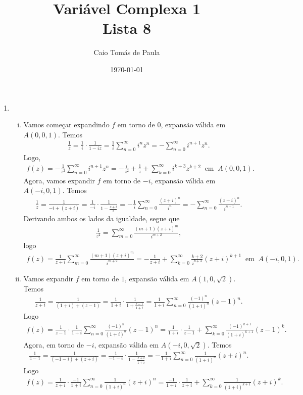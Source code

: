 \documentclass[12pt,a4paper]{article}
\title{\textbf{Variável Complexa 1}\\ Lista 8}
\author{Caio Tomás de Paula}
\date{\today}
\begin{document}
	\maketitle
	\begin{enumerate}	
		\item\begin{enumerate}[(i)]
			\item Vamos começar expandindo $f$ em torno de $0$, expansão válida em $A(0,0,1)$. Temos
			\begin{align*}
			\frac{1}{z} = \frac{1}{i}\cdot\frac{1}{1 - iz} = \frac{1}{i}\sum_{n=0}^{\infty}i^nz^n = -\sum_{n=0}^{\infty}i^{n+1}z^n.
			\end{align*}
			Logo,
			\begin{align*}
			f(z) = -\frac{1}{z^2}\sum_{n=0}^{\infty}i^{n+1}z^n = -\frac{i}{z^2} + \frac{1}{z} + \sum_{k=0}^{\infty}i^{k+3}z^{k+2} \ \text{ em } \ A(0,0,1).
			\end{align*}
			Agora, vamos expandir $f$ em torno de $-i$, expansão válida em $A(-i,0,1)$. Temos
			\begin{align*}
			\frac{1}{z} = \frac{1}{-i + (z+i)} = \frac{1}{-i}\cdot\frac{1}{1 - \frac{z+i}{i}} = -\frac{1}{i}\sum_{n=0}^{\infty}\frac{(z+i)^n}{i^n} = -\sum_{n=0}^{\infty}\frac{(z+i)^n}{i^{n+1}}.
			\end{align*}
			Derivando ambos os lados da igualdade, segue que
			\begin{align*}
			\frac{1}{z^2} = \sum_{m=0}^{\infty}\frac{(m+1)(z+i)^{m}}{i^{m+2}},
			\end{align*}
			logo
			\begin{align*}
			f(z) = \frac{1}{z+i}\sum_{m=0}^{\infty}\frac{(m+1)(z+i)^{m}}{i^{m+2}} = -\frac{1}{z+i} + \sum_{k=0}^{\infty}\frac{k+2}{i^{k+3}}(z+i)^{k+1} \ \text{ em } \ A(-i,0,1).
			\end{align*}
			
			\item Vamos expandir $f$ em torno de $1$, expansão válida em $A(1,0,\sqrt{2})$. Temos
			\begin{align*}
			\frac{1}{z+i} = \frac{1}{(1+i) + (z-1)} = \frac{1}{1+i}\cdot\frac{1}{1 + \frac{z-1}{1+i}} = \frac{1}{1+i}\sum_{n=0}^{\infty}\frac{(-1)^n}{(1+i)^n}(z-1)^n.
			\end{align*}
			Logo
			\begin{align*}
			f(z) = \frac{1}{z-1}\cdot\frac{1}{1+i}\sum_{n=0}^{\infty}\frac{(-1)^n}{(1+i)^n}(z-1)^n = \frac{1}{1+i}\cdot\frac{1}{z-1} + \sum_{k=0}^{\infty}\frac{(-1)^{k+1}}{(1+i)^{k+1}}(z-1)^k.
			\end{align*}
			Agora, em torno de $-i$, expansão válida em $A(-i,0,\sqrt{2})$. Temos
			\begin{align*}
			\frac{1}{z-1} = \frac{1}{(-1-i) + (z+i)} = \frac{1}{-1-i}\cdot\frac{1}{1 - \frac{z+i}{1+i}} = -\frac{1}{1+i}\sum_{n=0}^{\infty}\frac{1}{(1+i)^n}(z+i)^n.
			\end{align*}
			Logo
			\begin{align*}
			f(z) = \frac{1}{z+i}\cdot\frac{-1}{1+i}\sum_{n=0}^{\infty}\frac{1}{(1+i)^n}(z+i)^n = \frac{-1}{1+i}\cdot\frac{1}{z+i} + \sum_{k=0}^{\infty}\frac{1}{(1+i)^{k+1}}(z+i)^k.
			\end{align*}
						

\end{enumerate}
\end{enumerate}
\end{document}
